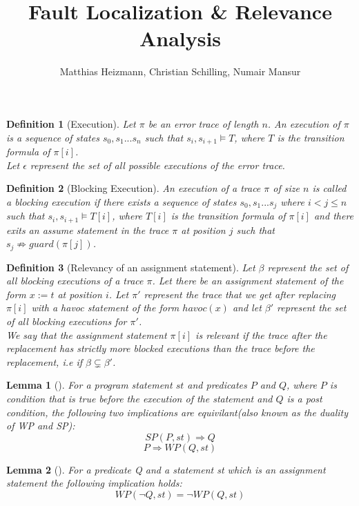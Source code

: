 \documentclass{article}
\title{Fault Localization \& Relevance Analysis \\ }
\author{Matthias Heizmann, Christian Schilling, Numair Mansur}
\newcommand{\limp}{\Rightarrow}
\newtheorem{mydef}{Definition}
\newtheorem{lemma}{Lemma}
\begin{document}
\maketitle

\begin{mydef}[Execution]\label{mydef:execution}
Let $\pi$ be an error trace of length $n$. An execution of $\pi$ is a sequence of states $s_0, s_1...s_n$ such that $s_i, s_{i+1} \models T$, where $T$ is the transition formula of $\pi[i]$. \\
Let $\epsilon$ represent the set of all possible executions of the error trace.
\end{mydef}

\begin{mydef}[Blocking Execution]\label{mydef:blockingexecution}
An execution of a trace $\pi$ of size $n$ is called a blocking execution if there exists a sequence of states $s_0, s_1...s_j$ where $i<j \leq n$ such that $s_i, s_{i+1} \models T[i]$, where $T[i]$ is the transition formula of $\pi[i]$ and there exits an assume statement in the trace $\pi$ at position $j$ such that $s_{j} \not \limp guard(\pi[j])$.
\end{mydef}

\begin{mydef}[Relevancy of an assignment statement]\label{mydef:relevancy}
Let $\beta$ represent the set of all blocking executions of a trace $\pi$. Let there be an assignment statement of the form $x:=t$ at position $i$. Let $\pi'$ represent the trace that we get after replacing $\pi[i]$ with a havoc statement of the form $havoc(x)$ and let $\beta'$ represent the set of all blocking executions for $\pi'$.\\
We say that the assignment statement $\pi[i]$ is relevant if the trace after the replacement has strictly more blocked executions than the trace before the replacement, i.e if $\beta \subsetneq \beta'$. 
\end{mydef}

\begin{lemma}[]\label{lemma:duality}
For a program statement $st$ and predicates $P$ and $Q$, where $P$ is condition that is true before the execution of the statement and $Q$ is a post condition, the following two implications are equivilant(also known as the duality of WP and SP):
$$SP(P,st) \Rightarrow Q$$
$$P \Rightarrow WP(Q,st)$$
\end{lemma}

\begin{lemma}[]\label{lemma:neg_wp_assignment}
For a predicate Q and a statement st which is an assignment statement the following implication holds:\\
$$WP(\neg Q,st) = \neg WP(Q,st)$$
\end{lemma}
\end{document}

